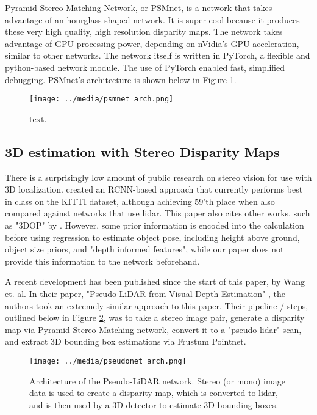 Pyramid Stereo Matching Network, or PSMnet, is a network that takes advantage of an hourglass-shaped network. It is super cool because it produces these very high quality, high resolution disparity maps. The network takes advantage of GPU processing power, depending on nVidia's GPU acceleration, similar to other networks. The network itself is written in PyTorch, a flexible and python-based network module. The use of PyTorch enabled fast, simplified debugging. PSMnet's architecture is shown below in Figure \ref{psmnet_arch}. 


\begin{figure}[h] %
    \texttt{[image: ../media/psmnet\_arch.png]}
    \caption{text.}
    \label{psmnet_arch} %
\end{figure}




\subsection{3D estimation with Stereo Disparity Maps}
There is a surprisingly low amount of public research on stereo vision for use with 3D localization. \cite{li_stereo_2019} created an RCNN-based approach that currently performs best in class on the KITTI dataset, although achieving 59'th place when also compared against networks that use lidar. This paper also cites other works, such as "3DOP" by \cite{chen_3d_2016}. However, some prior information is encoded into the calculation before using regression to estimate object pose, including height above ground, object size priors, and "depth informed features", while our paper does not provide this information to the network beforehand.

A recent development has been published since the start of this paper, by Wang et. al. In their paper, "Pseudo-LiDAR from Visual Depth Estimation" \cite{wang_pseudo-lidar_2019}, the authors took an extremely similar approach to this paper. Their pipeline / steps, outlined below in Figure \ref{pseudonet_arch}, was to take a stereo image pair, generate a disparity map via Pyramid Stereo Matching network, convert it to a "pseudo-lidar" scan, and extract 3D bounding box estimations via Frustum Pointnet. \\

\begin{figure}[h] %
    \texttt{[image: ../media/pseudonet\_arch.png]}
    \caption{Architecture of the Pseudo-LiDAR network. Stereo (or mono) image data is used to create a disparity map, which is converted to lidar, and is then used by a 3D detector to estimate 3D bounding boxes.}
    \label{pseudonet_arch} %
\end{figure}

